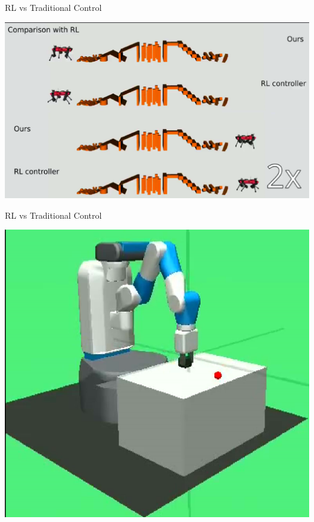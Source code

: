 \begin{frame}{RL vs Traditional Control}

    \begin{center}
        \href{run:img/mpc-compressed.mp4}{
        \includegraphics[scale=0.20]
        {img/mpc-thumb.png}
        }
    \end{center}

\end{frame}

\begin{frame}{RL vs Traditional Control}
    \begin{center}
        \href{run:img/fetch.mp4}{
        \includegraphics[scale=0.30]
        {img/fetch.png}
        }
    \end{center}
\end{frame}


